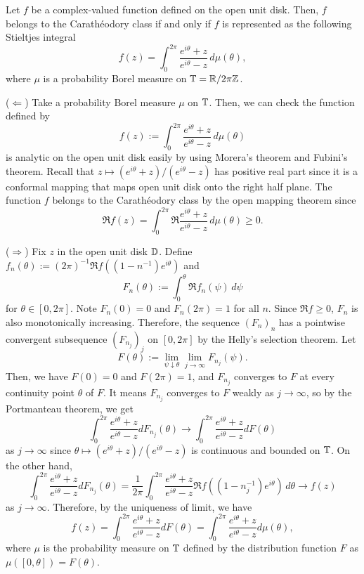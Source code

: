 \documentclass[10pt]{article}
\begin{document}
\begin{thm}
Let $f$ be a complex-valued function defined on the open unit disk.
Then, $f$ belongs to the Carath\'eodory class if and only if $f$ is represented as the following Stieltjes integral
\[f(z)=\int_0^{2\pi}\frac{e^{i\theta}+z}{e^{i\theta}-z}\,d\mu(\theta),\]
where $\mu$ is a probability Borel measure on $\mathbb{T}=\mathbb{R}/2\pi\mathbb{Z}$.
\end{thm}
\begin{pf}
($\Leftarrow$)
Take a probability Borel measure $\mu$ on $\mathbb{T}$.
Then, we can check the function defined by
\[f(z):=\int_0^{2\pi}\frac{e^{i\theta}+z}{e^{i\theta}-z}\,d\mu(\theta)\]
is analytic on the open unit disk easily by using Morera's theorem and Fubini's theorem.
Recall that $z\mapsto(e^{i\theta}+z)/(e^{i\theta}-z)$ has positive real part since it is a conformal mapping that maps open unit disk onto the right half plane.
The function $f$ belongs to the Carath\'eodory class by the open mapping theorem since
\[\Re f(z)=\int_0^{2\pi}\Re\frac{e^{i\theta}+z}{e^{i\theta}-z}\,d\mu(\theta)\ge0.\]

($\Rightarrow$)
Fix $z$ in the open unit disk $\mathbb{D}$.
Define $f_n(\theta):=(2\pi)^{-1}\Re f((1-n^{-1})e^{i\theta})$ and
\[F_n(\theta):=\int_0^\theta\Re f_n(\psi)\,d\psi\]
for $\theta\in[0,2\pi]$.
Note $F_n(0)=0$ and $F_n(2\pi)=1$ for all $n$.
Since $\Re f\ge0$, $F_n$ is also monotonically increasing.
Therefore, the sequence $(F_n)_n$ has a pointwise convergent subsequence $(F_{n_j})_j$ on $[0,2\pi]$ by the Helly's selection theorem.
Let
\[F(\theta):=\lim_{\psi\downarrow\theta}\lim_{j\to\infty}F_{n_j}(\psi).\]
Then, we have $F(0)=0$ and $F(2\pi)=1$, and $F_{n_j}$ converges to $F$ at every continuity point $\theta$ of $F$.
It means $F_{n_j}$ converges to $F$ weakly as $j\to\infty$, so by the Portmanteau theorem, we get
\[\int_0^{2\pi}\frac{e^{i\theta}+z}{e^{i\theta}-z}dF_{n_j}(\theta)\to\int_0^{2\pi}\frac{e^{i\theta}+z}{e^{i\theta}-z}dF(\theta)\]
as $j\to\infty$ since $\theta\mapsto(e^{i\theta}+z)/(e^{i\theta}-z)$ is continuous and bounded on $\mathbb{T}$.
On the other hand,
\[\int_0^{2\pi}\frac{e^{i\theta}+z}{e^{i\theta}-z}dF_{n_j}(\theta)
=\frac1{2\pi}\int_0^{2\pi}\frac{e^{i\theta}+z}{e^{i\theta}-z}\Re f((1-n_j^{-1})e^{i\theta})\,d\theta\to f(z)\]
as $j\to\infty$.
Therefore, by the uniqueness of limit, we have
\[f(z)=\int_0^{2\pi}\frac{e^{i\theta}+z}{e^{i\theta}-z}dF(\theta)=\int_0^{2\pi}\frac{e^{i\theta}+z}{e^{i\theta}-z}d\mu(\theta),\]
where $\mu$ is the probability measure on $\mathbb{T}$ defined by the distribution function $F$ as $\mu([0,\theta])=F(\theta)$.
\end{pf}
\end{document}
